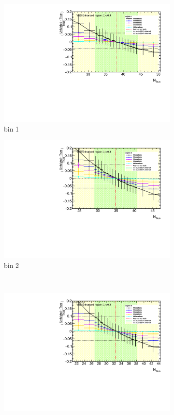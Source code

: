 \begin{figure}[htb]
    \centering
    \begin{subfigure}{.48\textwidth}
        \centering
        \includegraphics[width=.9\linewidth]{figures/Analysis/Unfolding/unfolding_bias_mjj_noFakes_VBSEnh_bin1.pdf}
        \caption{ bin 1}
    \end{subfigure}
    \begin{subfigure}{.48\textwidth}
        \centering
        \includegraphics[width=.9\linewidth]{figures/Analysis/Unfolding/unfolding_bias_mjj_noFakes_VBSEnh_bin2.pdf}
        \caption{bin 2 }
    \end{subfigure}\\
    \begin{subfigure}{.48\textwidth}
        \centering
        \includegraphics[width=.9\linewidth]{figures/Analysis/Unfolding/unfolding_bias_mjj_noFakes_VBSEnh_bin3.pdf}

\end{subfigure}
\end{figure}
